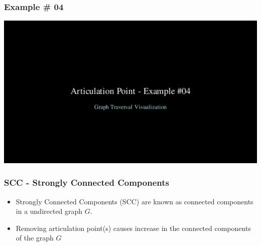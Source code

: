 \begin{frame}
    \frametitle{Example \# 04}
    \begin{center}
        \href{https://drive.google.com/file/d/1fK3Roh2BQrmu08Y9DjCE91dDoYBKczVv/view?usp=sharing}{\includegraphics[width=\linewidth]{figures/general/exm04.png}}
    \end{center}
\end{frame}

\begin{frame}
    \frametitle{SCC - Strongly Connected Components}
    \vspace{5pt}
    \begin{itemize}
        \item Strongly Connected Components (SCC) are known as connected components in a undirected graph $G$.
        \item Removing articulation point(s) causes increase in the connected components of the graph $G$
    \end{itemize}
\end{frame}

